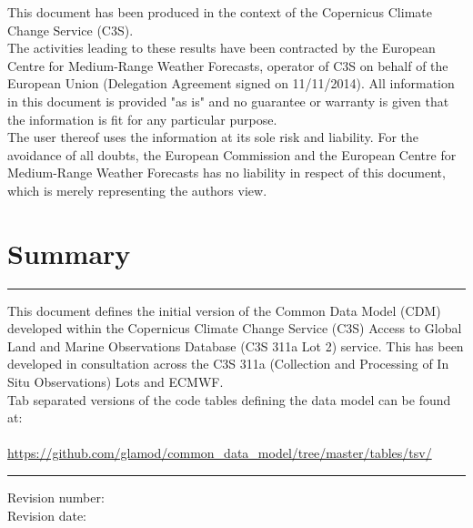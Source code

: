 \documentclass[a4paper,11pt]{article}
\newcounter{FramedDepth}
\newenvironment{Framed}{%
  \addtocounter{FramedDepth}{1}
  \ifcase\theFramedDepth\def\FrameColour{white!50}%
    \or\def\FrameColour{white!50}%
    \or\def\FrameColour{white!50}%
    \or\def\FrameColour{white!50}%
    \fi%
  \begin{mdframed}[style=Framed,backgroundcolor=\FrameColour]%
}{\end{mdframed}\addtocounter{FramedDepth}{-1}}
\begin{document}
\newpage

\vspace*{\fill}
\begin{Framed}
This document has been produced in the context of the Copernicus Climate Change Service (C3S).\\
The activities leading to these results have been contracted by the European Centre for Medium-Range Weather Forecasts, operator of C3S on behalf of the European Union (Delegation Agreement signed on 11/11/2014). All information in this document is provided "as is" and no guarantee or warranty is given that the information is fit for any particular purpose.\\
The user thereof uses the information at its sole risk and liability. For the avoidance of all doubts, the European Commission
and the European Centre for Medium-Range Weather Forecasts has no liability in respect of this document, which is merely representing the authors view.
\end{Framed}

\newpage

\maketitle

\vskip 0.25in
\section*{Summary}
\hrule
\vskip 0.25in
This document defines the initial version of the Common Data Model (CDM) developed within the Copernicus Climate Change Service (C3S) Access to Global Land and Marine Observations Database (C3S 311a Lot 2) service. This has been developed in consultation across the C3S 311a (Collection and Processing of In Situ Observations) Lots and ECMWF.\\
\vskip 0.25in
Tab separated versions of the code tables defining the data model can be found at:\\ \\
\tabto{2cm} \url{https://github.com/glamod/common_data_model/tree/master/tables/tsv/}
\vskip 0.25in
\hrule
\vskip 1in
Revision number: \revision \\
Revision date: \revisiondate \\
\end{document}
